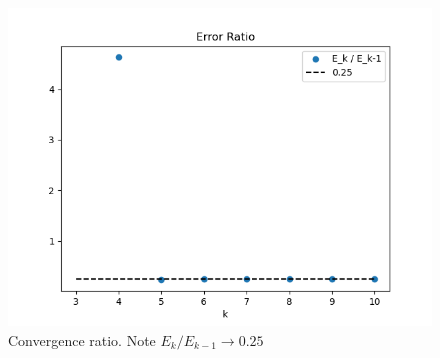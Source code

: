 \documentclass{template}
\begin{document}
\begin{figure}
    \centering
    \includegraphics[width=0.65\linewidth]{convergence.png}
    \caption{Convergence ratio. Note $E_{k}/E_{k-1} \rightarrow 0.25$}
    \label{fig:convergence-ratio}
\end{figure}





\end{document}
